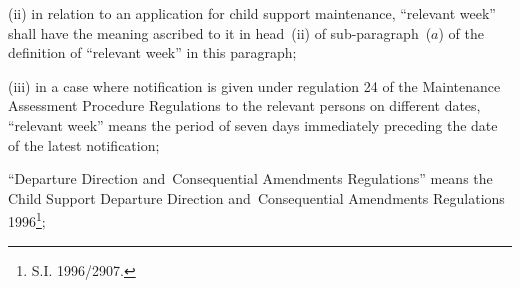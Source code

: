 \documentclass[12pt,a4paper]{article}
\begin{document}
\begin{enumerate}
\begin{enumerate}
(ii) in relation to an application for child support maintenance, “relevant week” shall have the meaning ascribed to it in head~(ii) of sub-paragraph~($a$) of the definition of “relevant week” in this paragraph;

%

(iii) in a case where notification is given under regulation 24 of the Maintenance Assessment Procedure Regulations to the relevant persons on different dates, “relevant week” means the period of seven days immediately preceding the date of the latest notification;
\end{enumerate}


\begin{sloppypar}
“Departure Direction and~Consequential Amendments Regulations” means the Child Support Departure Direction and~Consequential Amendments Regulations 1996\footnote{\frenchspacing S.I. 1996/2907.};
\end{sloppypar}



\end{enumerate}
\end{document}
